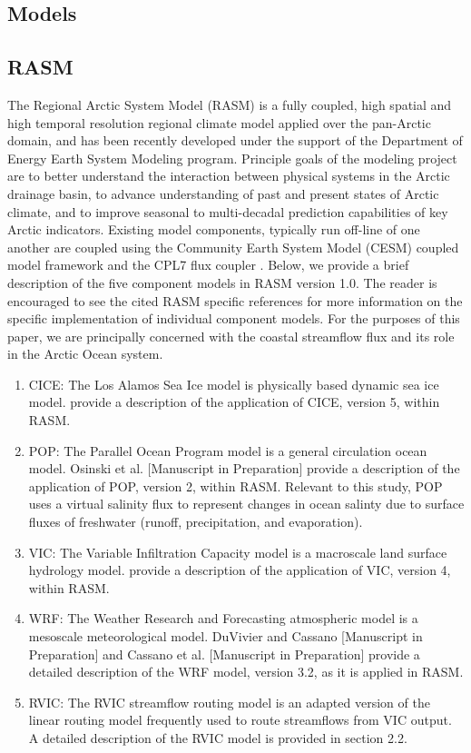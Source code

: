 \documentclass[ms, draft]{agutex}
\begin{document}
\begin{article}
\section{Models}

\subsection{RASM}

The Regional Arctic System Model (RASM) is a fully coupled, high spatial and high temporal resolution regional climate model applied over the pan-Arctic domain, and has been recently developed under the support of the Department of Energy Earth System Modeling program.
Principle goals of the modeling project are to better understand the interaction between physical systems in the Arctic drainage basin, to advance understanding of past and present states of Arctic climate, and to improve seasonal to multi-decadal prediction capabilities of key Arctic indicators.
Existing model components, typically run off-line of one another are coupled using the Community Earth System Model (CESM) coupled model framework and the CPL7 flux coupler \cite{Craig_2011}.
Below, we provide a brief description of the five component models in RASM version 1.0.
The reader is encouraged to see the cited RASM specific references for more information on the specific implementation of individual component models.
For the purposes of this paper, we are principally concerned with the coastal streamflow flux and its role in the Arctic Ocean system.

\begin{enumerate}
\item CICE: The Los Alamos Sea Ice model \citep{Hunke_2010} is physically based dynamic sea ice model.
\citet{Roberts_2015b} provide a description of the application of CICE, version 5, within RASM.
\item POP: The Parallel Ocean Program model \cite{Smith_2010} is a general circulation ocean model.
Osinski et al. [Manuscript in Preparation] provide a description of the application of POP, version 2, within RASM.
Relevant to this study, POP uses a virtual salinity flux to represent changes in ocean salinty due to surface fluxes of freshwater (runoff, precipitation, and evaporation).
\item VIC: The Variable Infiltration Capacity model \cite{Liang_1996} is a macroscale land surface hydrology model.
\citet{Hamman_2015} provide a description of the application of VIC, version 4, within RASM.
\item WRF: The Weather Research and Forecasting atmospheric model \citep{Skamarock_2007} is a mesoscale meteorological model.
DuVivier and Cassano [Manuscript in Preparation] and Cassano et al. [Manuscript in Preparation] provide a detailed description of the WRF model, version 3.2, as it is applied in RASM.
\item RVIC: The RVIC streamflow routing model is an adapted version of the \citet{Lohmann_1996} linear routing model frequently used to route streamflows from VIC output.
A detailed description of the RVIC model is provided in section 2.2.
\end{enumerate}


\end{article}
\end{document}
